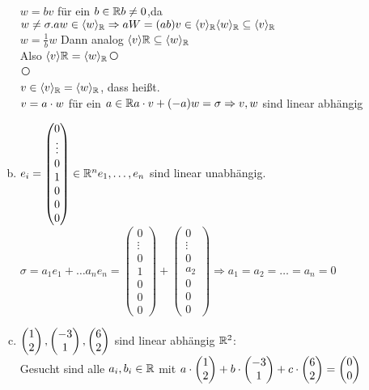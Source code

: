 \begin{enumerate}[a)]
$w = bv$ für ein $b \in \mathbb{R} b \ne 0$,da $w \ne \sigma.\\
aw \in \langle w \rangle_{\mathbb{R}} \Rightarrow aW = (ab)v \in \langle v\rangle_{\mathbb{R}}\\
\langle w \rangle_{\mathbb{R}} \subseteq \langle v \rangle_{\mathbb{R}}$\\
$w = \frac1b w$ Dann analog $\langle v \rangle\mathbb{R} \subseteq \langle w \rangle_{\mathbb{R}}$\\
Also $ \langle v \rangle\mathbb{R} = \langle w \rangle_{\mathbb{R}}$\textcircled{\raisebox{-1pt}{4}}\\
\textcircled{\raisebox{-1pt}{4}}\\
$v \in \langle v \rangle_{\mathbb{R}} = \langle w \rangle_{\mathbb{R}}$, dass hei\ss t.\\
$ v = a \cdot w$ für ein $a \in \mathbb{R}\\
a \cdot v + (-a) w = \sigma \Rightarrow v,w$ sind linear abhängig \textcircled{\raisebox{-1pt}{1}}
\item $e_i = \begin{pmatrix}
0\\\vdots\\0\\1\\0\\0\\0
\end{pmatrix} \in \mathbb{R}^n\\
e_1,\ldots,e_n$ sind linear unabhängig.\\
$\sigma = a_1e_1 + \ldots a_ne_n = \begin{pmatrix}
0\\\vdots\\0\\1\\0\\0\\0
\end{pmatrix} + \begin{pmatrix}
0\\\vdots\\0\\a_2\\0\\0\\0
\end{pmatrix} \Rightarrow a_1 = a_2 = \ldots = a_n = 0$
\item $\begin{pmatrix} 1\\2\\ \end{pmatrix},\begin{pmatrix} -3\\1\\ \end{pmatrix},\begin{pmatrix} 6\\2\\ \end{pmatrix}$ sind linear abhängig $\mathbb{R}^2$: \\
Gesucht sind alle $a_i,b_i \in \mathbb{R}$ mit $a \cdot \begin{pmatrix} 1\\2\\ \end{pmatrix} + b \cdot \begin{pmatrix} -3\\1\\ \end{pmatrix} + c \cdot \begin{pmatrix} 6\\2\\ \end{pmatrix} = \begin{pmatrix} 0\\0\\ \end{pmatrix}$\\

\end{enumerate}
